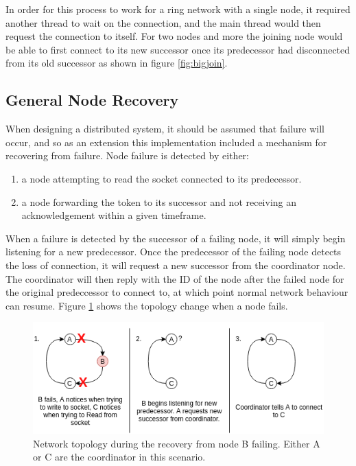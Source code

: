 \documentclass[12pt]{article}
\begin{document}
In order for this process to work for a ring network with a single node,
it required another thread to wait on the connection, and the main thread
would then request the connection to itself. For two nodes and more the
joining node would be able to first connect to its new successor once its
predecessor had disconnected from its old successor as shown in figure \ref{fig:bigjoin}. 

\subsection{General Node Recovery}

When designing a distributed system, it should be assumed that failure will occur, and so as an extension this implementation included a mechanism for recovering from failure. Node failure is detected by either:
\begin{enumerate}
	\item a node attempting to read the socket connected to its predecessor.
	\item a node forwarding the token to its successor and not receiving an acknowledgement within a given timeframe.
\end{enumerate}

When a failure is detected by the successor of a failing node, it will simply begin listening for a new predecessor. Once the predecessor of the failing node detects the loss of connection, it will request a new successor from the coordinator node. The coordinator will then reply with the ID of the node after the failed node for the original predeccessor to connect to, at which point normal network behaviour can resume. Figure \ref{fig:failure} shows the topology change when a node fails.

\begin{figure}[!ht]
	\centering
	\includegraphics[width=\linewidth]{images/failure}
	\caption{Network topology during the recovery from node B failing. Either A or C are the coordinator in this scenario.}
	\label{fig:failure}
\end{figure}
\end{document}

